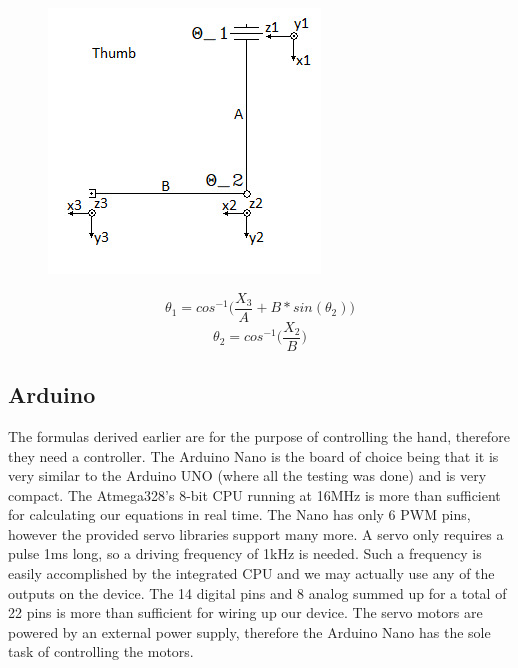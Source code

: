 \documentclass{article}
\begin{document}
\begin{figure}[!hb]
    \begin{minipage}[b]{0.49\textwidth}
    	\centering
		\includegraphics[width=\textwidth]{IMG/IK_06.jpeg}
	\end{minipage}
    \hfill
    \begin{minipage}[b]{0.49\textwidth}
		\[ \theta_1 = cos^{-1}\bigg(\frac{X_3}{A}+B*sin(\theta_2)\bigg)\]
		\[ \theta_2 = cos^{-1}\bigg(\frac{X_2}{B}\bigg) \]\vspace{80pt} 	
	\end{minipage}
\end{figure}






\subsection{Arduino}
The formulas derived earlier are for the purpose of controlling the hand, therefore they need a controller. The Arduino Nano is the board of choice being that it is very similar to the Arduino UNO (where all the testing was done) and is very compact. The Atmega328's 8-bit CPU running at 16MHz is more than sufficient for calculating our equations in real time. The Nano has only 6 PWM pins, however the provided servo libraries support many more. A servo only requires a pulse 1ms long, so a driving frequency of 1kHz is needed. Such a frequency is easily accomplished by the integrated CPU and we may actually use any of the outputs on the device. The 14 digital pins and 8 analog summed up for a total of 22 pins is more than sufficient for wiring up our device. The servo motors are powered by an external power supply, therefore the Arduino Nano has the sole task of controlling the motors.
\end{document}
